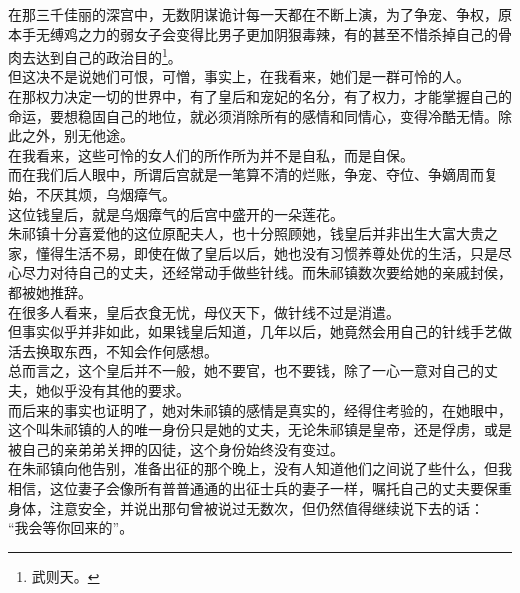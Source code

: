 \begin{multicols}{\theparacolNo}
在那三千佳丽的深宫中，无数阴谋诡计每一天都在不断上演，为了争宠、争权，原本手无缚鸡之力的弱女子会变得比男子更加阴狠毒辣，有的甚至不惜杀掉自己的骨肉去达到自己的政治目的\footnote{武则天。}。\\

但这决不是说她们可恨，可憎，事实上，在我看来，她们是一群可怜的人。\\

在那权力决定一切的世界中，有了皇后和宠妃的名分，有了权力，才能掌握自己的命运，要想稳固自己的地位，就必须消除所有的感情和同情心，变得冷酷无情。除此之外，别无他途。\\

在我看来，这些可怜的女人们的所作所为并不是自私，而是自保。\\

而在我们后人眼中，所谓后宫就是一笔算不清的烂账，争宠、夺位、争嫡周而复始，不厌其烦，乌烟瘴气。\\

这位钱皇后，就是乌烟瘴气的后宫中盛开的一朵莲花。\\

朱祁镇十分喜爱他的这位原配夫人，也十分照顾她，钱皇后并非出生大富大贵之家，懂得生活不易，即使在做了皇后以后，她也没有习惯养尊处优的生活，只是尽心尽力对待自己的丈夫，还经常动手做些针线。而朱祁镇数次要给她的亲戚封侯，都被她推辞。\\

在很多人看来，皇后衣食无忧，母仪天下，做针线不过是消遣。\\

但事实似乎并非如此，如果钱皇后知道，几年以后，她竟然会用自己的针线手艺做活去换取东西，不知会作何感想。\\

总而言之，这个皇后并不一般，她不要官，也不要钱，除了一心一意对自己的丈夫，她似乎没有其他的要求。\\

而后来的事实也证明了，她对朱祁镇的感情是真实的，经得住考验的，在她眼中，这个叫朱祁镇的人的唯一身份只是她的丈夫，无论朱祁镇是皇帝，还是俘虏，或是被自己的亲弟弟关押的囚徒，这个身份始终没有变过。\\

在朱祁镇向他告别，准备出征的那个晚上，没有人知道他们之间说了些什么，但我相信，这位妻子会像所有普普通通的出征士兵的妻子一样，嘱托自己的丈夫要保重身体，注意安全，并说出那句曾被说过无数次，但仍然值得继续说下去的话：\\

“我会等你回来的”。\\


\end{multicols}
